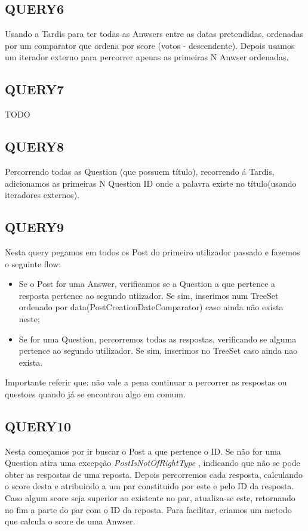 \documentclass[letterpaper, 10 pt, conference]{IEEEtran}  %
\begin{document}
\subsection{QUERY6}

Usando a Tardis para ter todas as Anwsers entre as datas pretendidas, ordenadas por um comparator 
que ordena por score (votos - descendente). Depois usamos um iterador externo para percorrer apenas as primeiras N Anwser ordenadas.

\subsection{QUERY7}

TODO

\subsection{QUERY8}

Percorrendo todas as Question (que possuem título), recorrendo á Tardis, adicionamos as primeiras N Question ID onde a palavra
existe no título(usando iteradores externos).

\subsection{QUERY9}

Nesta query pegamos em todos os Post do primeiro utilizador passado e fazemos o seguinte flow:
\begin{itemize}
    \item Se o Post for uma Answer, verificamos se a Question a que pertence a resposta pertence ao segundo utiizador. Se sim,
    inserimos num TreeSet ordenado por data(PostCreationDateComparator) caso ainda não exista neste;
    \item Se for uma Question, percorremos todas as respostas, verificando se alguma pertence ao segundo utilizador. Se sim, inserimos
    no TreeSet caso ainda nao exista.
\end{itemize}
    Importante referir que: não vale a pena continuar a percorrer as respostas ou questoes quando já se encontrou algo em comum.


\subsection{QUERY10}

Nesta começamos por ir buscar o Post a que pertence o ID. Se não for uma Question atira uma excepção \textit{PostIsNotOfRightType}
, indicando que não se pode obter as respostas de uma reposta.
Depois percorremos cada resposta, calculando o score desta e atribuindo a um par constituido por este e pelo ID da resposta.
Caso algum score seja superior ao existente no par, atualiza-se este, retornando no fim a parte do par com o ID da reposta.
Para facilitar, criamos um metodo que calcula o score de uma Anwser.
\end{document}
